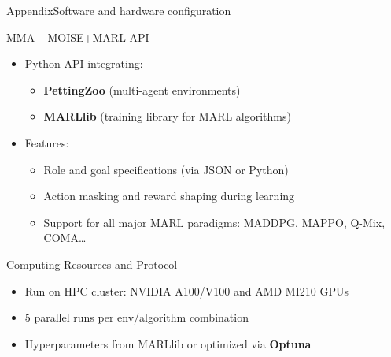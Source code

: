 \begin{frame}{Appendix}{Software and hardware configuration}

  \begin{block}{MMA – MOISE+MARL API}
    \begin{itemize}
      \item Python API integrating:
            \begin{itemize}
              \item \textbf{PettingZoo} (multi-agent environments)
              \item \textbf{MARLlib} (training library for MARL algorithms)
            \end{itemize}
      \item Features:
            \begin{itemize}
              \item Role and goal specifications (via JSON or Python)
              \item Action masking and reward shaping during learning
              \item Support for all major MARL paradigms: MADDPG, MAPPO, Q-Mix, COMA\dots
            \end{itemize}
    \end{itemize}
  \end{block}

  \vspace{0.5em}

  \begin{block}{Computing Resources and Protocol}
    \begin{itemize}
      \item Run on HPC cluster: NVIDIA A100/V100 and AMD MI210 GPUs
      \item 5 parallel runs per env/algorithm combination
      \item Hyperparameters from MARLlib or optimized via \textbf{Optuna}~\autocite{akiba2019optuna}
    \end{itemize}
  \end{block}

\end{frame}

